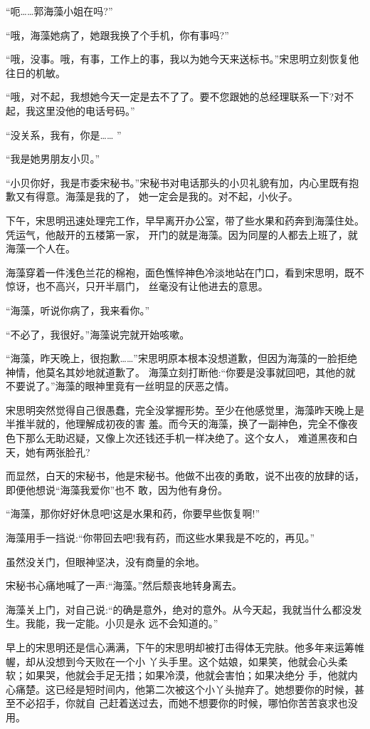 \documentclass[11pt,a4paper,onecolumn]{article}
\begin{document}
``呃……郭海藻小姐在吗?''

``哦，海藻她病了，她跟我换了个手机，你有事吗?''

``哦，没事。哦，有事，工作上的事，我以为她今天来送标书。''宋思明立刻恢复他往日的机敏。

``哦，对不起，我想她今天一定是去不了了。要不您跟她的总经理联系一下?对不起，我这里没他的电话号码。''

``没关系，我有，你是…… ''

``我是她男朋友小贝。''

``小贝你好，我是市委宋秘书。''宋秘书对电话那头的小贝礼貌有加，内心里既有抱歉又有得意。海藻是我的了，
她一定会是我的。对不起，小伙子。

下午，宋思明迅速处理完工作，早早离开办公室，带了些水果和药奔到海藻住处。凭运气，他敲开的五楼第一家，
开门的就是海藻。因为同屋的人都去上班了，就海藻一个人在。

海藻穿着一件浅色兰花的棉袍，面色憔悴神色冷淡地站在门口，看到宋思明，既不惊讶，也不高兴，只开半扇门，
丝毫没有让他进去的意思。

``海藻，听说你病了，我来看你。''

``不必了，我很好。''海藻说完就开始咳嗽。

``海藻，昨天晚上，很抱歉……''宋思明原本根本没想道歉，但因为海藻的一脸拒绝神情，他莫名其妙地就道歉了。
海藻立刻打断他:``你要是没事就回吧，其他的就不要说了。''海藻的眼神里竟有一丝明显的厌恶之情。

宋思明突然觉得自己很愚蠢，完全没掌握形势。至少在他感觉里，海藻昨天晚上是半推半就的，他理解成初夜的害
羞。而今天的海藻，换了一副神色，完全不像夜色下那么无助迟疑，又像上次还钱还手机一样决绝了。这个女人，
难道黑夜和白天，她有两张脸孔?

而显然，白天的宋秘书，他是宋秘书。他做不出夜的勇敢，说不出夜的放肆的话，即便他想说``海藻我爱你''也不
敢，因为他有身份。

``海藻，那你好好休息吧!这是水果和药，你要早些恢复啊!''

海藻用手一挡说:``你带回去吧!我有药，而这些水果我是不吃的，再见。''

虽然没关门，但眼神坚决，没有商量的余地。

宋秘书心痛地喊了一声:``海藻。''然后颓丧地转身离去。

海藻关上门，对自己说:``的确是意外，绝对的意外。从今天起，我就当什么都没发生。我能，我一定能。小贝是永
远不会知道的。''

早上的宋思明还是信心满满，下午的宋思明却被打击得体无完肤。他多年来运筹帷幄，却从没想到今天败在一个小
丫头手里。这个姑娘，如果笑，他就会心头柔软；如果哭，他就会手足无措；如果冷漠，他就会害怕；如果决绝分
手，他就内心痛楚。这已经是短时间内，他第二次被这个小丫头抛弃了。她想要你的时候，甚至不必招手，你就自
己赶着送过去，而她不想要你的时候，哪怕你苦苦哀求也没用。
\end{document}
